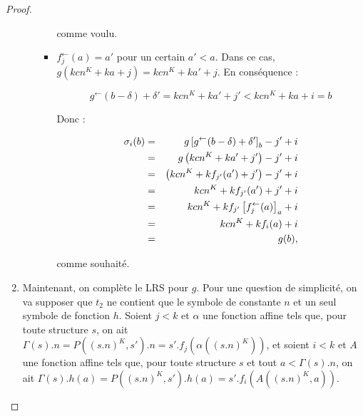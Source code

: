 \begin{proof}
\begin{enumerate}[itemsep=-1mm,leftmargin=2cm]
\begin{itemize}[itemsep=-1mm, leftmargin=1cm]
\begin{itemize}[itemsep=-1mm,leftmargin=1cm]
									comme voulu.
									
								\item
									$f_j^{\leftarrow}(a) = a'$ pour un certain $a' < a$. Dans ce cas, $g\left( kcn^K + ka + j \right) = kcn^K + ka' + j$. En conséquence : 
									
									\[
										g^{\leftarrow}\left( b - \delta \right) + \delta' = kcn^K + ka' + j' < kcn^K + ka + i = b
									\]
									
									Donc :
									
									\setcounter{equation}{0}
									\begin{eqnarray}
										\sigma_i(b) 	& = &	g\left[ g^{\leftarrow}(b-\delta) +\delta' \right]_{b} - j' + i \\
														& = & 	g\left( kcn^K + ka' + j' \right) - j' + i \\
														& = & 	\left( kcn^K + k f_{j'}(a') + j' \right) - j' + i \\
														& = & 	kcn^K + k f_{j'}(a') + j' + i \\
														& = & 	kcn^K + k f_{j'}\left[ f_j^{\leftarrow}(a) \right]_{a} + i \\
														& = & 	kcn^K + k f_i(a) + i \\
														& = & 	g(b),
									\end{eqnarray}
									
									comme souhaité.
							\end{itemize}
					\end{itemize}
					
					
				\item	
					Maintenant, on complète le LRS pour $g$. Pour une question de simplicité, on va supposer que $t_2$ ne contient que le symbole de constante $n$ et un seul symbole de fonction $h$. Soient $j <k$ et $\alpha$ une fonction affine tels que, pour toute structure $s$, on ait $\Gamma(s).n = P\left((s.n)^K, s'\right).n = s'.f_j\left(\alpha\left( (s.n)^K \right)\right)$, et soient $i <k$ et $A$ une fonction affine tels que, pour toute structure $s$ et tout $a < \Gamma(s).n$, on ait $\Gamma(s).h(a) = P\left((s.n)^K, s'\right).h(a) = s'.f_i\left(A\left( (s.n)^K, a \right)\right)$\footnotemark.
					
					

\end{enumerate}
\end{proof}
